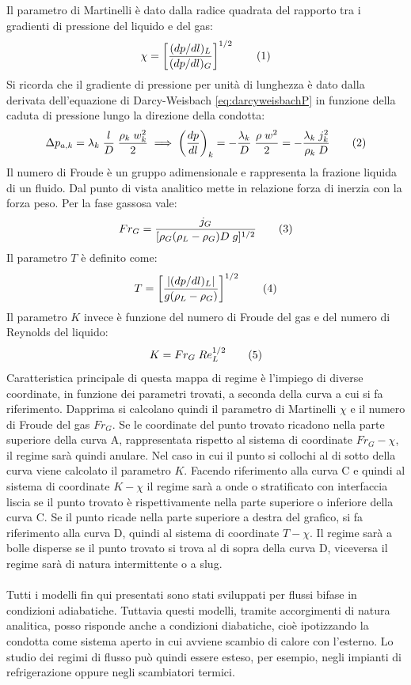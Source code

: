 Il parametro di Martinelli è dato dalla radice quadrata del rapporto tra i gradienti di pressione del liquido e del gas:
\[\chi = \left[ \frac{(dp/dl)_L}{(dp/dl)_G} \right]^{1/2} \addtag \label{eq:martinelli} \]
Si ricorda che il gradiente di pressione per unità di lunghezza è dato dalla derivata dell'equazione di Darcy-Weisbach \eqref{eq:darcyweisbachP} in funzione della caduta di pressione lungo la direzione della condotta:
\[\Delta p_{a,k} = \lambda_k \; \frac{l}{D} \; \frac{\rho_k \; w_k^2}{2} \implies \left(\dfrac{dp}{dl}\right)_k =- \frac{\lambda_k}{D} \; \frac{\rho \; w^2}{2} = - \frac{\lambda_k \; j_k^2}{\rho_k \; D}  \addtag \label{eq:gradientepressione} \]
Il numero di Froude è un gruppo adimensionale e rappresenta la frazione liquida di un fluido.  Dal punto di vista analitico mette in relazione forza di inerzia con la forza peso. Per la fase gassosa vale:
\[Fr_G = \frac{j_G}{[\rho_G(\rho_L-\rho_G)D \; g]^{1/2}} \addtag \label{eq:froude}\]
Il parametro \(T\) è definito come:
\[ T = \left[ \dfrac{|(dp/dl)_L|}{g(\rho_L-\rho_G)} \right]^{1/2} \addtag \label{parametroT} \]
Il parametro \(K\) invece è funzione del numero di Froude del gas e del numero di Reynolds del liquido:
\[K=Fr_G \; Re_L^{1/2} \addtag \label{parametroK} \]
Caratteristica principale di questa mappa di regime è l'impiego di diverse coordinate, in funzione dei parametri trovati, a seconda della curva a cui si fa riferimento. Dapprima si calcolano quindi il parametro di Martinelli \(\chi\) e il numero di Froude del gas \(Fr_G\). Se le coordinate del punto trovato ricadono nella parte superiore della curva A, rappresentata rispetto al sistema di coordinate \(Fr_G-\chi\), il regime sarà quindi anulare. Nel caso in cui il punto si collochi al di sotto della curva viene calcolato il parametro \(K\). Facendo riferimento alla curva C e quindi al sistema di coordinate \(K-\chi\) il regime sarà a onde o stratificato con interfaccia liscia se il punto trovato è rispettivamente nella parte superiore o inferiore della curva C. Se il punto ricade nella parte superiore a destra del grafico, si fa riferimento alla curva D, quindi al sistema di coordinate \(T - \chi \). Il regime sarà a bolle disperse se il punto trovato si trova al di sopra della curva D, viceversa il regime sarà di natura intermittente o a slug. \\ \\
Tutti i modelli fin qui presentati sono stati sviluppati per flussi bifase in condizioni adiabatiche. Tuttavia questi modelli, tramite accorgimenti di natura analitica, posso risponde anche a condizioni diabatiche, cioè ipotizzando la condotta come sistema aperto in cui avviene scambio di calore con l'esterno. Lo studio dei regimi di flusso può quindi essere esteso, per esempio, negli impianti di refrigerazione oppure negli scambiatori termici.

